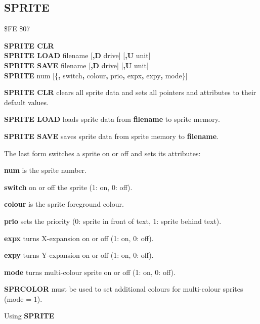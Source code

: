 \subsection{SPRITE}
\begin{description}[leftmargin=2cm,style=nextline]
\item [Token:]    \$FE \$07

\item [Format:]   {\bf SPRITE CLR} \\
                  {\bf SPRITE LOAD} filename [{\bf,D} drive] [{\bf,U} unit] \\
                  {\bf SPRITE SAVE} filename [{\bf,D} drive] [{\bf,U} unit] \\
                  {\bf SPRITE} num [\{{\bf,} switch{\bf,} colour{\bf,} prio{\bf,} expx{\bf,} expy{\bf,} mode\}]

\item [Usage:]    {\bf SPRITE CLR} clears all sprite data and sets all pointers and attributes to their default values.

                  {\bf SPRITE LOAD } loads sprite data from {\bf filename} to sprite memory.

                  {\bf SPRITE SAVE } saves sprite data from sprite memory to {\bf filename}.

                  \filenamedefinition

                  The last form switches a sprite on or off and sets its attributes:

                  {\bf num} is the sprite number.

                  {\bf switch} on or off the sprite (1: on, 0: off).

                  {\bf colour} is the sprite foreground colour.

                  {\bf prio} sets the priority (0: sprite in front of text, 1: sprite behind text).

                  {\bf expx} turns X-expansion on or off (1: on, 0: off).

                  {\bf expy} turns Y-expansion on or off (1: on, 0: off).

                  {\bf mode} turns multi-colour sprite on or off (1: on, 0: off).

\item [Remarks:]  {\bf SPRCOLOR} must be used to set additional colours for multi-colour sprites (mode = 1).

\item [Example:]  Using {\bf SPRITE}


\end{description}
